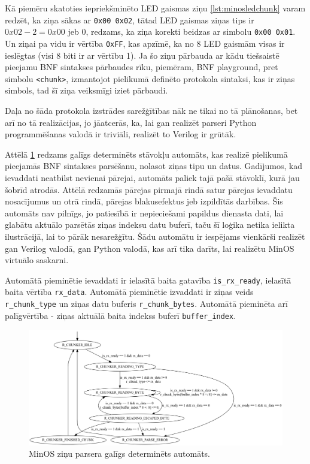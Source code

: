 Kā piemēru skatoties iepriekšminēto LED gaismas ziņu \ref{lst:minosledchunk}
varam redzēt, ka ziņa sākas ar \lstinline!0x00 0x02!, tātad LED gaismas ziņas
tips ir \(0x02 - 2 = 0x00\) jeb \(0\), redzams, ka ziņa korekti beidzas ar
simbolu \lstinline!0x00 0x01!. Un ziņai pa vidu ir vērtība \lstinline!0xFF!, kas
apzīmē, ka no 8 LED gaismām visas ir ieslēgtas (visi 8 biti ir ar vērtību 1). Ja
šo ziņu pārbauda ar kādu tiešsaistē pieejamu BNF sintakses pārbaudes rīku,
piemēram, BNF playground, \cite{BNFPlayground} pret simbolu \lstinline!<chunk>!,
izmantojot pielikumā definēto protokola sintaksi, kas ir ziņas simbols, tad šī
ziņa veiksmīgi iziet pārbaudi.

Daļa no šāda protokola izstrādes sarežģītības nāk ne tikai no tā plānošanas, bet
arī no tā realizācijas, jo jāatcerās, ka, lai gan realizēt parseri Python
programmēšanas valodā ir triviāli, realizēt to Verilog
 ir grūtāk.

Attēlā \ref{fig:chunkparser} redzams galīgs determinēts stāvokļu automāts, kas
realizē pielikumā pieejamās BNF sintakses parsēšanu, nolasot ziņas tipu un
datus. Gadījumos, kad ievaddati neatbilst nevienai pārejai, automāts paliek tajā
pašā stāvoklī, kurā jau šobrīd atrodās. Attēlā redzamās pārejas pirmajā rindā
satur pārejas ievaddatu nosacījumus un otrā rindā, pārejas blakusefektus jeb
izpildītās darbības. Šis automāts nav pilnīgs, jo patiesībā ir nepieciešami
papildus dienasta dati, lai glabātu aktuālo parsētās ziņas indeksu datu buferī,
taču šī loģika netika ielikta ilustrācijā, lai to pārāk nesarežģītu. Šādu
automātu ir iespējams vienkārši realizēt gan Verilog valodā, gan Python valodā,
kas arī tika darīts, lai realizētu MinOS virtuālo saskarni.

Automātā pieminētie ievaddati ir ielasītā baita gatavība
\lstinline!is_rx_ready!, ielasītā baita vērtība \lstinline!rx_data!. Automātā
pieminētie izvaddati ir ziņas veids \lstinline!r_chunk_type! un ziņas datu
buferis \lstinline!r_chunk_bytes!. Automātā pieminēta arī palīgvērtība - ziņas
aktuālā baita indekss buferī \lstinline!buffer_index!.

\begin{figure}[H]
    \includegraphics[width=1.0\linewidth]{assets/chunkparser.png}
    \centering
    \caption{MinOS ziņu parsera galīgs determinēts automāts.}
    \label{fig:chunkparser}
\end{figure}

